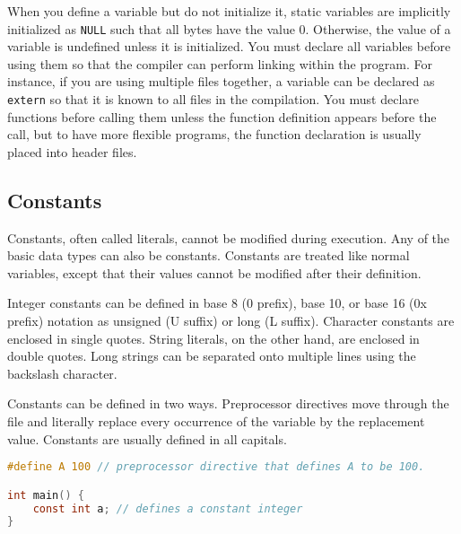 \documentclass[10pt]{article}
\begin{document}
When you define a variable but do not initialize it, static variables are implicitly initialized as {\tt NULL} such that all bytes have the value 0. Otherwise, the value of a variable is undefined unless it is initialized. You must declare all variables before using them so that the compiler can perform linking within the program. For instance, if you are using multiple files together, a variable can be declared as {\tt extern} so that it is known to all files in the compilation. You must declare functions before calling them unless the function definition appears before the call, but to have more flexible programs, the function declaration is usually placed into header files. 

\subsection{Constants}
Constants, often called literals, cannot be modified during execution. Any of the basic data types can also be constants. Constants are treated like normal variables, except that their values cannot be modified after their definition. 

Integer constants can be defined in base 8 (0 prefix), base 10, or base 16 (0x prefix) notation as unsigned (U suffix) or long (L suffix). Character constants are enclosed in single quotes. String literals, on the other hand, are enclosed in double quotes. Long strings can be separated onto multiple lines using the backslash character. 

Constants can be defined in two ways. Preprocessor directives move through the file and literally replace every occurrence of the variable by the replacement value. Constants are usually defined in all capitals. 

\begin{lstlisting}[language=C]
#define A 100 // preprocessor directive that defines A to be 100.

int main() {
	const int a; // defines a constant integer
}
\end{lstlisting}
\end{document}
